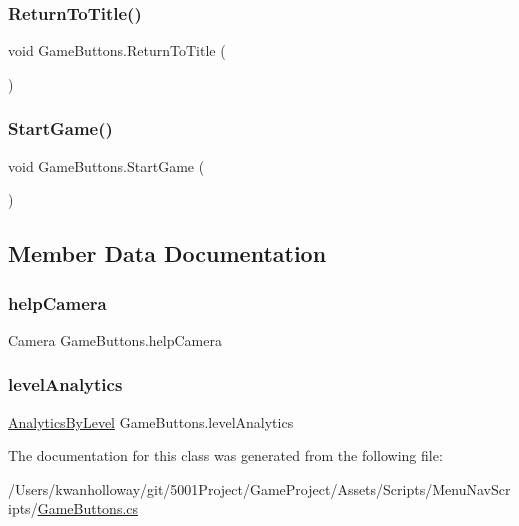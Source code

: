 \mbox{\label{class_game_buttons_aa24ecd9e57ec9e74b94d2e974655c630}} 
\subsubsection{\texorpdfstring{Return\+To\+Title()}{ReturnToTitle()}}
{\footnotesize\ttfamily void Game\+Buttons.\+Return\+To\+Title (\begin{DoxyParamCaption}{ }\end{DoxyParamCaption})}

\mbox{\label{class_game_buttons_acfb2c2af597071c65abe2535199bf5d9}} 
\subsubsection{\texorpdfstring{Start\+Game()}{StartGame()}}
{\footnotesize\ttfamily void Game\+Buttons.\+Start\+Game (\begin{DoxyParamCaption}{ }\end{DoxyParamCaption})}



\subsection{Member Data Documentation}
\mbox{\label{class_game_buttons_a2209c4c549e16c9c815b1c0a3a15bbbd}} 
\subsubsection{\texorpdfstring{help\+Camera}{helpCamera}}
{\footnotesize\ttfamily Camera Game\+Buttons.\+help\+Camera}

\mbox{\label{class_game_buttons_a1d1a3181b45c9bd292fa2490acb742c2}} 
\subsubsection{\texorpdfstring{level\+Analytics}{levelAnalytics}}
{\footnotesize\ttfamily \hyperlink{class_analytics_by_level}{Analytics\+By\+Level} Game\+Buttons.\+level\+Analytics}



The documentation for this class was generated from the following file\+:\begin{DoxyCompactItemize}
\item 
/\+Users/kwanholloway/git/5001\+Project/\+Game\+Project/\+Assets/\+Scripts/\+Menu\+Nav\+Scripts/\hyperlink{_game_buttons_8cs}{Game\+Buttons.\+cs}\end{DoxyCompactItemize}
